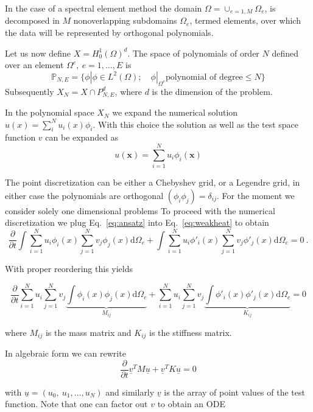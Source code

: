 \documentclass[10pt]{article}
\renewcommand{\d}{\mathrm{d}}
\newcommand{\vect}[1]{\mathbf{#1} }
\begin{document}
In the case of a spectral element method the domain $\Omega=\cup_{e=1,M} \Omega_e $, is decomposed in $M$ nonoverlapping 
subdomains $\Omega_e$, termed elements, over which the data will be represented by orthogonal polynomials.

Let us now define $X=H^1_0(\Omega)^d$. The space of polynomials of order $N$ defined over an element $\Omega^e, \ e=1,\ldots, E$ is
$$
\mathbb P_{N,E}=\lbrace  \phi| \phi \in L^2(\Omega); \quad \phi|_{\Omega^e} \text{polynomial of degree} \leq N\rbrace
$$
Subsequently $X_N=X\cap  P_{N,E}^d$, where $d$ is the dimension of the problem.

In the polynomial space $X_N$ we expand the numerical solution $u(x)=\sum_i^N u_i(x)\phi_i$.
With this choice the solution as well as the test space function $v$ can be expanded as
\begin{equation}
u(\vect x)=\sum_{i=1}^N u_{i}\phi_i(\vect x)
\label{eq:ansatz}
\end{equation}

The point discretization can be either a Chebyshev grid, or a Legendre grid, in either case the polynomials are orthogonal $(\phi_i \phi_j)=\delta_{ij}$. 
For the moment we consider solely one dimensional problems
To proceed with the numerical discretization we plug Eq.~\ref{eq:ansatz} into Eq.~\ref{eq:weakheat} to obtain
\begin{equation}
\frac{\partial}{\partial t}\int \sum_{i=1}^N u_{i}\phi_i(x) \sum_{j=1}^N v_{j}\phi_j(x) \d \Omega_e + \int\sum_{i=1}^N u_{i}\phi'_i(x) \sum_{j=1}^N v_{j}\phi'_j(x) \d \Omega_e  =0 \ .
\end{equation}

With proper reordering this yields

\begin{equation}
\frac{\partial}{\partial t}\sum_{i=1}^N u_{i}\sum_{j=1}^N  v_{j}\underbrace{\int \phi_i(x)\phi_j(x) \d \Omega_e}_{M_{ij}} + \sum_{i=1}^N u_{i}\sum_{j=1}^N v_{j}\underbrace{\int\phi'_i(x) \phi'_j(x) \d \Omega_e}_{K_{ij}}  =0
\end{equation}

where $M_{ij}$ is the mass matrix and $K_{ij}$ is the stiffness matrix.

In algebraic form we can rewrite
\begin{equation}
\frac{\partial}{\partial t}\underline{v}^TM\underline{u} + \underline{v}^TK\underline{u}=0
\end{equation}

with $\underline{u}=(u_0,\ u_1, \ldots, u_N)$ and similarly $\underline v$ is the array of point values of the test function. 
Note that one can factor out $v$ to obtain an ODE
\end{document}
